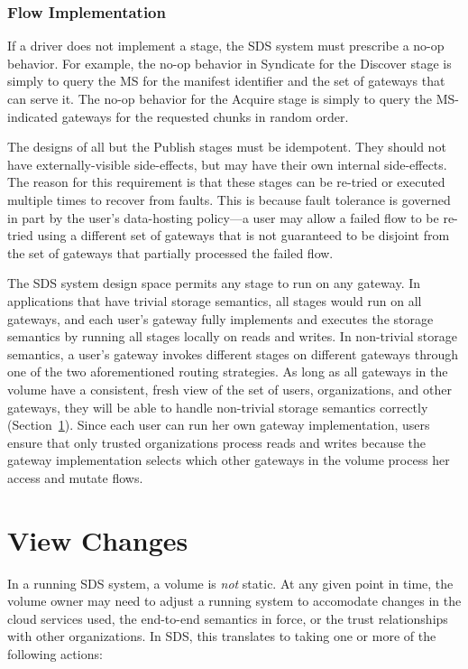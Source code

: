 \subsubsection{Flow Implementation}

If a driver does not implement a stage, the SDS system must prescribe a
no-op behavior.  For example, the no-op behavior in Syndicate for the
Discover stage is simply to query the MS for the manifest identifier and the 
set of gateways that can serve it.  The no-op behavior for the Acquire
stage is simply to query the MS-indicated gateways for the requested chunks
in random order.

The designs of all but the Publish stages must be
idempotent.  They should not have externally-visible side-effects, but may have
their own internal side-effects.  The reason
for this requirement is that these stages can be re-tried or executed
multiple times to recover from faults.  This is because fault tolerance is
governed in part by the user's data-hosting policy---a user may
allow a failed flow to be re-tried using a different set of gateways that is not
guaranteed to be disjoint from the set of gateways that partially processed
the failed flow.

The SDS system design space permits any stage to run on any gateway.  In
applications that have trivial storage semantics, all stages would run on all
gateways, and each user's gateway fully implements and executes the storage semantics
by running all stages locally on reads and writes.
In non-trivial storage semantics, a user's gateway invokes different stages on
different gateways through one of the two aforementioned routing strategies.
As long as all gateways in the volume have a consistent, fresh view of the set
of users, organizations, and other gateways, they will be able to handle
non-trivial storage semantics correctly (Section~\ref{sec:view-changes}).
Since each user can run her own gateway implementation, users ensure that
only trusted organizations process reads and writes because the gateway
implementation selects which other gateways in the volume process her access and
mutate flows.

\section{View Changes}
\label{sec:view-changes}

In a running SDS system, a volume is \emph{not} static.  At any given point in
time, the volume owner may need to adjust a running system to accomodate changes
in the cloud services used, the end-to-end semantics in force, or the trust
relationships with other organizations.  In SDS, this translates
to taking one or more of the following actions:

